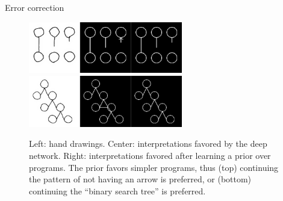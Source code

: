 \documentclass[final]{beamer}
\newlength{\onecolwid}
\newlength{\twocolwid}
\begin{document}
\begin{frame}[t]
\begin{columns}[t]
\begin{column}{\twocolwid}
\begin{columns}[t,totalwidth=\twocolwid]
\begin{column}{\onecolwid}
\begin{block}{Error correction}
    \vspace{2cm}
    \begin{figure}
        \includegraphics[width = 0.6\textwidth]{figures/programSuccess7.png}\hfill
  \includegraphics[width = 0.6\textwidth]{figures/programSuccess16.png}
  \caption{Left: hand drawings. Center: interpretations favored by the deep network. Right: interpretations favored after learning a prior over programs. The prior favors  simpler programs, thus (top) continuing the pattern of not having an arrow is preferred, or (bottom) continuing the ``binary search tree'' is preferred.}
      \end{figure}
    \end{block}




\end{column} %

\end{columns} %



\begin{columns}[t,totalwidth=\twocolwid] %


\begin{column}{\onecolwid} %





\end{column}
\end{columns}
\end{column}
\end{columns}
\end{frame}
\end{document}
